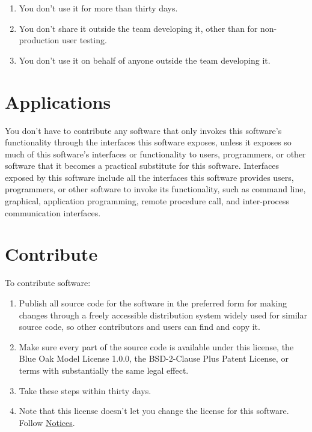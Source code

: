 \documentclass[12pt,letterpaper]{article}
\begin{document}
\begin{enumerate}
\item
  You don't use it for more than thirty days.
\item
  You don't share it outside the team developing it, other than for
  non-production user testing.
\item
  You don't use it on behalf of anyone outside the team developing it.
\end{enumerate}

\hypertarget{Applications}{\section*{Applications}}

You don't have to contribute any software that only invokes this
software's functionality through the interfaces this software exposes,
unless it exposes so much of this software's interfaces or functionality
to users, programmers, or other software that it becomes a practical
substitute for this software. Interfaces exposed by this software
include all the interfaces this software provides users, programmers, or
other software to invoke its functionality, such as command line,
graphical, application programming, remote procedure call, and
inter-process communication interfaces.

\section*{Contribute}

To contribute software:

\begin{enumerate}
\item
  Publish all source code for the software in the preferred form for
  making changes through a freely accessible distribution system widely
  used for similar source code, so other contributors and users can find
  and copy it.
\item
  Make sure every part of the source code is available under this
  license, the Blue Oak Model License 1.0.0, the BSD-2-Clause Plus
  Patent License, or terms with substantially the same legal effect.
\item
  Take these steps within thirty days.
\item
  Note that this license doesn't let you change the license for this
  software. Follow \hyperlink{Notices}{Notices}.
\end{enumerate}
\end{document}
